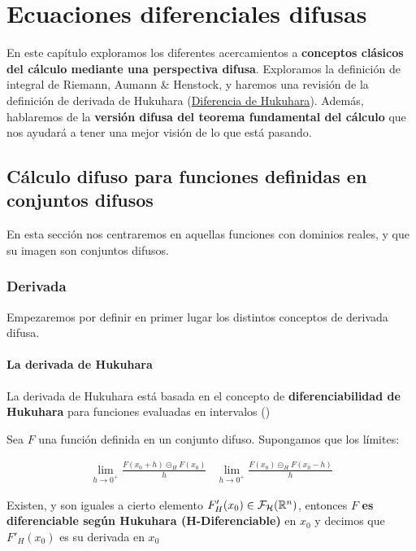 \chapter{Ecuaciones diferenciales difusas}
En este capítulo exploramos los diferentes acercamientos a \textbf{conceptos clásicos del cálculo mediante una perspectiva difusa}. Exploramos la definición de integral de Riemann, Aumann \& Henstock, y haremos una revisión de la definición de derivada de Hukuhara (\hyperref[def:hukukara]{Diferencia de Hukuhara}). Además, hablaremos de la \textbf{versión difusa del teorema fundamental del cálculo} que nos ayudará a tener una mejor visión de lo que está pasando.

\section{Cálculo difuso para funciones definidas en conjuntos difusos}
En esta sección nos centraremos en aquellas funciones con dominios reales, y que su imagen son conjuntos difusos.
\subsection{Derivada}
Empezaremos por definir en primer lugar los distintos conceptos de derivada difusa.

\subsubsection{La derivada de Hukuhara}
La derivada de Hukuhara está basada en el concepto de \textbf{diferenciabilidad de Hukuhara} para funciones evaluadas en intervalos (\cite{derivatehukuhara})

\begin{definicion}
	Sea $F$ una función definida en un conjunto difuso. Supongamos que los límites:
	
	\[
		\begin{array}{c||c}
			\lim\limits_{h \rightarrow 0^+} \frac{F(x_0 + h) \circleddash_H F(x_0)}{h} & \lim\limits_{h \rightarrow 0^+} \frac{F(x_0) \circleddash_H F(x_0 - h)}{h}
		\end{array}
	\]
	
	Existen, y son iguales a cierto elemento $F'_H(x_0) \in \mathcal{F}_\mathcal{H}(\mathbb R^n)$, entonces $F$ \textbf{es diferenciable según Hukuhara (H-Diferenciable)} en $x_0$ y decimos que $F'_H(x_0)$ es su derivada en $x_0$ 
\end{definicion}

